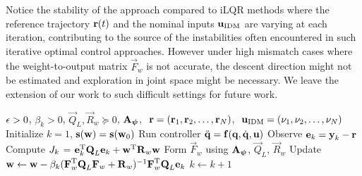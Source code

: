 
Notice the stability of the approach compared to iLQR methods where the reference trajectory $\boldsymbol{\mathrm{r}}(t)$ and the nominal inputs $\boldsymbol{\mathrm{u}}_{\mathrm{IDM}}$ are varying at each iteration, contributing to the source of the instabilities often encountered in such iterative optimal control approaches. However under high mismatch cases where the weight-to-output matrix $\vec{F}_{w}$ is not accurate, the descent direction might not be estimated and exploration in joint space might be necessary. We leave the extension of our work to such difficult settings for future work.

\begin{algorithm}[tb]
   \caption{\alg}
   \label{alg1}
\begin{algorithmic}
    $\epsilon > 0$, $\beta_k > 0$, $\vec{Q}_L, \vec{R}_{w} \succeq 0$, $\boldsymbol{\mathrm{A}}_{\boldsymbol{\mathrm{\psi}}}$, $\ \boldsymbol{\mathrm{r}} = (\boldsymbol{\mathrm{r}}_1, \boldsymbol{\mathrm{r}}_2, \ldots, \boldsymbol{\mathrm{r}}_N)$, $\ \boldsymbol{\mathrm{u}}_{\mathrm{IDM}} = (\nu_1, \nu_2, \ldots, \nu_N)$
   \STATE Initialize $k = 1$, $\boldsymbol{\mathrm{s}}(\boldsymbol{\mathrm{w}}) = \boldsymbol{\mathrm{s}}(\boldsymbol{\mathrm{w}}_0)$
   \REPEAT 
 	   \STATE Run controller $\ddot{\boldsymbol{\mathrm{q}}} = \boldsymbol{\mathrm{f}}(\boldsymbol{\mathrm{q}},\dot{\boldsymbol{\mathrm{q}}},\boldsymbol{\mathrm{u}})$ %
 	   \STATE Observe $\boldsymbol{\mathrm{e}}_k = \boldsymbol{\mathrm{y}}_k - \boldsymbol{\mathrm{r}}$
 	   \STATE Compute $J_k$ = $\boldsymbol{\mathrm{e}}_k^{\mathrm{T}}\boldsymbol{\mathrm{Q}}_L\boldsymbol{\mathrm{e}}_k + \boldsymbol{\mathrm{w}}^{\mathrm{T}}\boldsymbol{\mathrm{R}}_w\boldsymbol{\mathrm{w}}$
 	   \STATE Form $\vec{F}_w$ using $\boldsymbol{\mathrm{A}}_{\boldsymbol{\mathrm{\psi}}}$, $\vec{Q}_L$, $\vec{R}_{w}$
 	   \STATE Update $\boldsymbol{\mathrm{w}} \leftarrow \boldsymbol{\mathrm{w}} - \beta_k(\boldsymbol{\mathrm{F}}_{w}^{\mathrm{T}}\boldsymbol{\mathrm{Q}}_L\boldsymbol{\mathrm{F}}_{w} + \boldsymbol{\mathrm{R}}_{w})^{-1}\boldsymbol{\mathrm{F}}_{w}^{\mathrm{T}}\boldsymbol{\mathrm{Q}}_L\boldsymbol{\mathrm{e}}_k$
 	   \STATE $k \leftarrow k + 1$
\end{algorithmic}
\end{algorithm}